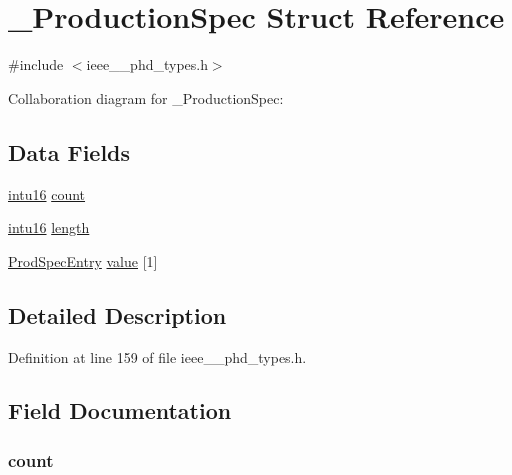 \hypertarget{struct___production_spec}{}\section{\+\_\+\+Production\+Spec Struct Reference}
\label{struct___production_spec}


{\ttfamily \#include $<$ieee\+\_\+\_\+phd\+\_\+types.\+h$>$}



Collaboration diagram for \+\_\+\+Production\+Spec\+:
\subsection*{Data Fields}
\begin{DoxyCompactItemize}
\item 
\hyperlink{ieee__11073__phd__types_8h_a3561595d2aa7416532e1c9910abd076d}{intu16} \hyperlink{struct___production_spec_abf6db060ae8e224764b0f867fb135ecd}{count}
\item 
\hyperlink{ieee__11073__phd__types_8h_a3561595d2aa7416532e1c9910abd076d}{intu16} \hyperlink{struct___production_spec_a3743679e4ff85e3e1b3fc2e59973fbb3}{length}
\item 
\hyperlink{ieee__11073__phd__types_8h_a454c154ad1ac3335ddfbe49dd4c8f0ef}{Prod\+Spec\+Entry} \hyperlink{struct___production_spec_a6cf86cd9ffaf1d453e5e70f09b98f3fb}{value} \mbox{[}1\mbox{]}
\end{DoxyCompactItemize}


\subsection{Detailed Description}


Definition at line 159 of file ieee\+\_\+\_\+phd\+\_\+types.\+h.



\subsection{Field Documentation}
\hypertarget{struct___production_spec_abf6db060ae8e224764b0f867fb135ecd}{}
\subsubsection[{count}]{ count}\label{struct___production_spec_abf6db060ae8e224764b0f867fb135ecd}


